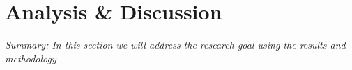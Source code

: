 \iffalse  \fi
\chapter{Analysis \& Discussion}
\textit{Summary: In this section we will address the research goal using the results and methodology}